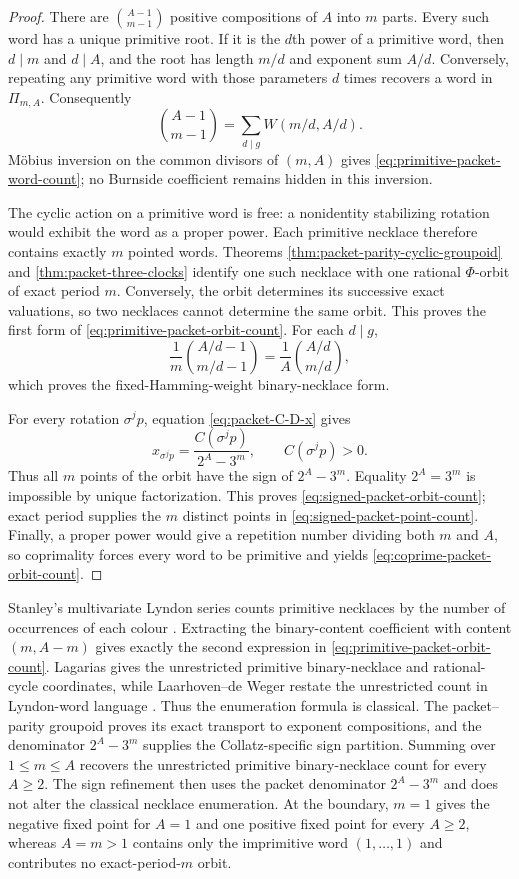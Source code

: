 \begin{proof}
There are $\binom{A-1}{m-1}$ positive compositions of $A$ into $m$
parts.  Every such word has a unique primitive root.  If it is the $d$th
power of a primitive word, then $d\mid m$ and $d\mid A$, and the root has
length $m/d$ and exponent sum $A/d$.  Conversely, repeating any primitive
word with those parameters $d$ times recovers a word in $\Pi_{m,A}$.
Consequently
\[
 \binom{A-1}{m-1}
 =\sum_{d\mid g}W(m/d,A/d).
\]
M\"obius inversion on the common divisors of $(m,A)$ gives
\eqref{eq:primitive-packet-word-count}; no Burnside coefficient remains
hidden in this inversion.

The cyclic action on a primitive word is free: a nonidentity stabilizing
rotation would exhibit the word as a proper power.  Each primitive necklace
therefore contains exactly $m$ pointed words.  Theorems
\ref{thm:packet-parity-cyclic-groupoid} and \ref{thm:packet-three-clocks}
identify one such necklace with one rational $\Phi$-orbit of exact period
$m$.  Conversely, the orbit determines its successive exact valuations, so
two necklaces cannot determine the same orbit.  This proves the first form
of \eqref{eq:primitive-packet-orbit-count}.  For each $d\mid g$,
\[
 \frac1m\binom{A/d-1}{m/d-1}
 =\frac1A\binom{A/d}{m/d},
\]
which proves the fixed-Hamming-weight binary-necklace form.

For every rotation $\sigma^jp$, equation \eqref{eq:packet-C-D-x} gives
\[
 x_{\sigma^jp}=\frac{C(\sigma^jp)}{2^A-3^m},
 \qquad C(\sigma^jp)>0.
\]
Thus all $m$ points of the orbit have the sign of $2^A-3^m$.  Equality
$2^A=3^m$ is impossible by unique factorization.  This proves
\eqref{eq:signed-packet-orbit-count}; exact period supplies the $m$ distinct
points in \eqref{eq:signed-packet-point-count}.  Finally, a proper power
would give a repetition number dividing both $m$ and $A$, so coprimality
forces every word to be primitive and yields
\eqref{eq:coprime-packet-orbit-count}.
\end{proof}

Stanley's multivariate Lyndon series counts primitive necklaces by the
number of occurrences of each colour
\cite[Exercise~7.89(a), equations~(7.149)--(7.150), and the solution on
printed p.~555]{Stanley2024}.  Extracting the binary-content coefficient
with content $(m,A-m)$ gives exactly the second expression in
\eqref{eq:primitive-packet-orbit-count}.  Lagarias gives the unrestricted
primitive binary-necklace and rational-cycle coordinates, while
Laarhoven--de Weger restate the unrestricted count in Lyndon-word language
\cite[pp.~38--39]{Lagarias1990}\cite[lines~303--315]{LaarhovenDeWeger2012}.
Thus the enumeration formula is classical.  The packet--parity groupoid
proves its exact transport to exponent compositions, and the denominator
$2^A-3^m$ supplies the Collatz-specific sign partition.  Summing over
$1\leq m\leq A$ recovers the unrestricted primitive binary-necklace count
for every $A\geq2$.  The sign refinement then uses the packet denominator
$2^A-3^m$ and does not alter the classical necklace enumeration.  At the
boundary, $m=1$ gives the negative fixed point for $A=1$ and one positive
fixed point for every $A\geq2$, whereas $A=m>1$ contains only the
imprimitive word $(1,\ldots,1)$ and contributes no exact-period-$m$ orbit.

